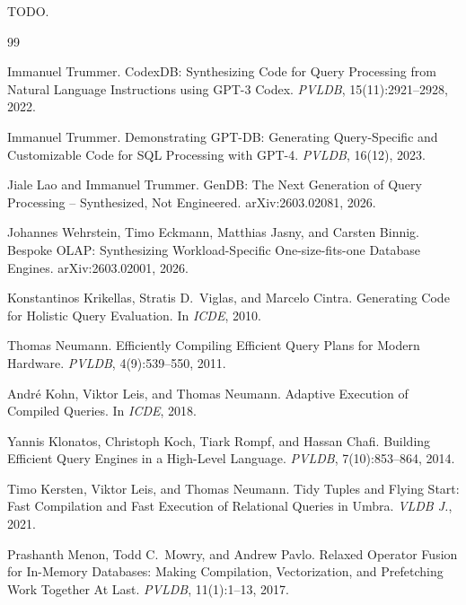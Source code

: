 \documentclass[sigconf, nonacm]{acmart}
\begin{document}
\begin{acks}
TODO.
\end{acks}

\begin{thebibliography}{99}

Immanuel Trummer.
\newblock CodexDB: Synthesizing Code for Query Processing from Natural Language Instructions using GPT-3 Codex.
\newblock \emph{PVLDB}, 15(11):2921--2928, 2022.

Immanuel Trummer.
\newblock Demonstrating GPT-DB: Generating Query-Specific and Customizable Code for SQL Processing with GPT-4.
\newblock \emph{PVLDB}, 16(12), 2023.

Jiale Lao and Immanuel Trummer.
\newblock GenDB: The Next Generation of Query Processing -- Synthesized, Not Engineered.
\newblock arXiv:2603.02081, 2026.

Johannes Wehrstein, Timo Eckmann, Matthias Jasny, and Carsten Binnig.
\newblock Bespoke OLAP: Synthesizing Workload-Specific One-size-fits-one Database Engines.
\newblock arXiv:2603.02001, 2026.

Konstantinos Krikellas, Stratis D.\ Viglas, and Marcelo Cintra.
\newblock Generating Code for Holistic Query Evaluation.
\newblock In \emph{ICDE}, 2010.

Thomas Neumann.
\newblock Efficiently Compiling Efficient Query Plans for Modern Hardware.
\newblock \emph{PVLDB}, 4(9):539--550, 2011.

Andr{\'e} Kohn, Viktor Leis, and Thomas Neumann.
\newblock Adaptive Execution of Compiled Queries.
\newblock In \emph{ICDE}, 2018.

Yannis Klonatos, Christoph Koch, Tiark Rompf, and Hassan Chafi.
\newblock Building Efficient Query Engines in a High-Level Language.
\newblock \emph{PVLDB}, 7(10):853--864, 2014.

Timo Kersten, Viktor Leis, and Thomas Neumann.
\newblock Tidy Tuples and Flying Start: Fast Compilation and Fast Execution of Relational Queries in Umbra.
\newblock \emph{VLDB J.}, 2021.

Prashanth Menon, Todd C.\ Mowry, and Andrew Pavlo.
\newblock Relaxed Operator Fusion for In-Memory Databases: Making Compilation, Vectorization, and Prefetching Work Together At Last.
\newblock \emph{PVLDB}, 11(1):1--13, 2017.


\end{thebibliography}
\end{document}
